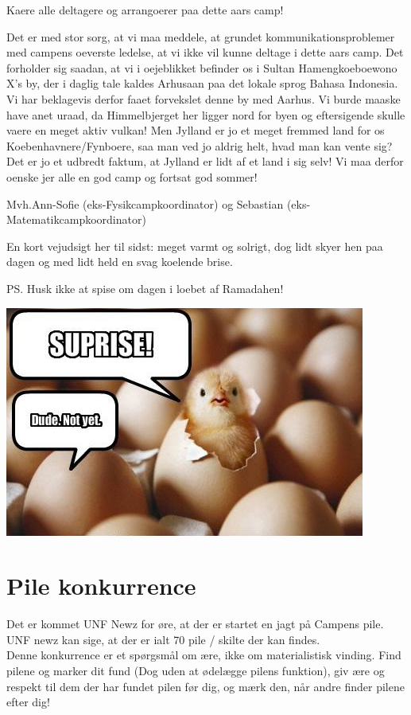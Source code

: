 \begin{minipage}[b]{0.95\linewidth}
\begin{minipage}[t]{0.47\textwidth}
Kaere alle deltagere og arrangoerer paa dette aars camp!

Det er med stor sorg, at vi maa meddele, at grundet kommunikationsproblemer med campens oeverste ledelse, at vi ikke vil kunne deltage i dette aars camp. 
Det forholder sig saadan, at vi i oejeblikket befinder os i Sultan Hamengkoeboewono X's by, der i daglig tale kaldes Arhusaan paa det lokale sprog Bahasa Indonesia. 
Vi har beklagevis derfor faaet forvekslet denne by med Aarhus. Vi burde maaske have anet uraad, da Himmelbjerget her ligger nord for byen og eftersigende skulle vaere en meget aktiv vulkan! Men Jylland er jo et meget fremmed land for os Koebenhavnere/Fynboere, saa man ved jo aldrig helt, hvad man kan vente sig? Det er jo et udbredt faktum, at Jylland er lidt af et land i sig selv!
Vi maa derfor oenske jer alle en god camp og fortsat god sommer!

Mvh.Ann-Sofie (eks-Fysikcampkoordinator) og Sebastian (eks-Matematikcampkoordinator)

En kort vejudsigt her til sidst: meget varmt og solrigt, dog lidt skyer hen paa dagen og med lidt held en svag koelende brise.

PS. Husk ikke at spise om dagen i loebet af Ramadahen!

\vspace{2mm}

\includegraphics[width=\linewidth]{suprise.jpg}

\vspace{-4mm}
\section*{Pile konkurrence}
Det er kommet UNF Newz for øre, at der er startet en jagt på Campens pile. UNF newz kan sige, at der er ialt 70 pile / skilte der kan findes. \\
Denne konkurrence er et spørgsmål om ære, ikke om materialistisk vinding. Find pilene og marker dit fund (Dog uden at ødelægge pilens funktion), giv ære og respekt til dem der har fundet pilen før dig, og mærk den, når andre finder pilene efter dig!

\end{minipage}
\end{minipage}
